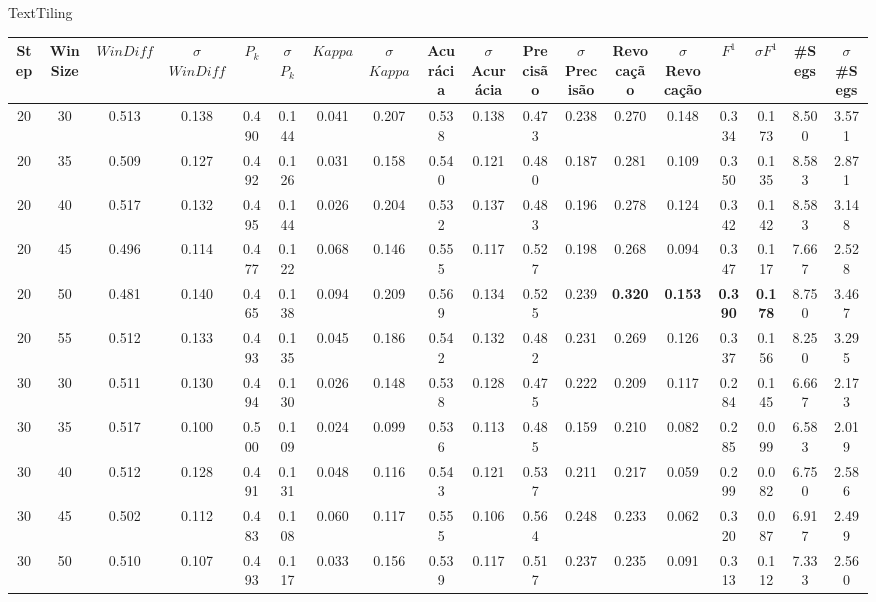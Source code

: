 \tiny
\center TextTiling
\begin{longtable}[c]{|c|c|c|c|c|c|c|c|c|c|c|c|c|c|c|c|c|c|} 
\hline 
 Step & Win Size & $WinDiff$ & $\sigma$$WinDiff$ & $P_k$ & $\sigma$$P_k$ & $Kappa$ & $\sigma$$Kappa$ & Acurácia & $\sigma$Acurácia & Precisão & $\sigma$Precisão & Revocação & $\sigma$Revocação & $F^1$ & $\sigma$$F^1$ & \#Segs & $\sigma$\#Segs\\ \hline 
 20 & 30 & 0.513 & 0.138 & 0.490 & 0.144 & 0.041 & 0.207 & 0.538 & 0.138 & 0.473 & 0.238 & 0.270 & 0.148 & 0.334 & 0.173 & 8.500 & 3.571  \\ \hline 
 20 & 35 & 0.509 & 0.127 & 0.492 & 0.126 & 0.031 & 0.158 & 0.540 & 0.121 & 0.480 & 0.187 & 0.281 & 0.109 & 0.350 & 0.135 & 8.583 & 2.871  \\ \hline 
 20 & 40 & 0.517 & 0.132 & 0.495 & 0.144 & 0.026 & 0.204 & 0.532 & 0.137 & 0.483 & 0.196 & 0.278 & 0.124 & 0.342 & 0.142 & 8.583 & 3.148  \\ \hline 
 20 & 45 & 0.496 & 0.114 & 0.477 & 0.122 & 0.068 & 0.146 & 0.555 & 0.117 & 0.527 & 0.198 & 0.268 & 0.094 & 0.347 & 0.117 & 7.667 & 2.528  \\ \hline 
 20 & 50 & 0.481 & 0.140 & 0.465 & 0.138 & 0.094 & 0.209 & 0.569 & 0.134 & 0.525 & 0.239 & \cellcolor{gray!20} \textbf{0.320} & \cellcolor{gray!20} \textbf{0.153} & \cellcolor{gray!20} \textbf{0.390} & \cellcolor{gray!20} \textbf{0.178} & 8.750 & 3.467  \\ \hline 
 20 & 55 & 0.512 & 0.133 & 0.493 & 0.135 & 0.045 & 0.186 & 0.542 & 0.132 & 0.482 & 0.231 & 0.269 & 0.126 & 0.337 & 0.156 & 8.250 & 3.295  \\ \hline 
 30 & 30 & 0.511 & 0.130 & 0.494 & 0.130 & 0.026 & 0.148 & 0.538 & 0.128 & 0.475 & 0.222 & 0.209 & 0.117 & 0.284 & 0.145 & 6.667 & 2.173  \\ \hline 
 30 & 35 & 0.517 & 0.100 & 0.500 & 0.109 & 0.024 & 0.099 & 0.536 & 0.113 & 0.485 & 0.159 & 0.210 & 0.082 & 0.285 & 0.099 & 6.583 & 2.019  \\ \hline 
 30 & 40 & 0.512 & 0.128 & 0.491 & 0.131 & 0.048 & 0.116 & 0.543 & 0.121 & 0.537 & 0.211 & 0.217 & 0.059 & 0.299 & 0.082 & 6.750 & 2.586  \\ \hline 
 30 & 45 & 0.502 & 0.112 & 0.483 & 0.108 & 0.060 & 0.117 & 0.555 & 0.106 & 0.564 & 0.248 & 0.233 & 0.062 & 0.320 & 0.087 & 6.917 & 2.499  \\ \hline 
 30 & 50 & 0.510 & 0.107 & 0.493 & 0.117 & 0.033 & 0.156 & 0.539 & 0.117 & 0.517 & 0.237 & 0.235 & 0.091 & 0.313 & 0.112 & 7.333 & 2.560  \\ \hline 

\end{longtable}
